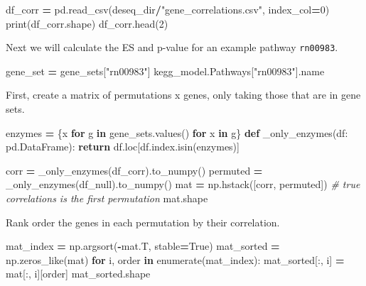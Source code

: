 \documentclass[
]{book}
\newenvironment{Shaded}{\begin{snugshade}}{\end{snugshade}}
\newcommand{\BuiltInTok}[1]{#1}
\newcommand{\CommentTok}[1]{\textcolor[rgb]{0.56,0.35,0.01}{\textit{#1}}}
\newcommand{\ControlFlowTok}[1]{\textcolor[rgb]{0.13,0.29,0.53}{\textbf{#1}}}
\newcommand{\DecValTok}[1]{\textcolor[rgb]{0.00,0.00,0.81}{#1}}
\newcommand{\KeywordTok}[1]{\textcolor[rgb]{0.13,0.29,0.53}{\textbf{#1}}}
\newcommand{\NormalTok}[1]{#1}
\newcommand{\OperatorTok}[1]{\textcolor[rgb]{0.81,0.36,0.00}{\textbf{#1}}}
\newcommand{\StringTok}[1]{\textcolor[rgb]{0.31,0.60,0.02}{#1}}
\newcommand{\VariableTok}[1]{\textcolor[rgb]{0.00,0.00,0.00}{#1}}
\begin{document}
\begin{Shaded}
\begin{Highlighting}[numbers=left,,]
\NormalTok{df\_corr }\OperatorTok{=}\NormalTok{ pd.read\_csv(deseq\_dir}\OperatorTok{/}\StringTok{"gene\_correlations.csv"}\NormalTok{, index\_col}\OperatorTok{=}\DecValTok{0}\NormalTok{)}
\BuiltInTok{print}\NormalTok{(df\_corr.shape)}
\NormalTok{df\_corr.head(}\DecValTok{2}\NormalTok{)}
\end{Highlighting}
\end{Shaded}

Next we will calculate the ES and p-value for an example pathway \texttt{rn00983}.

\begin{Shaded}
\begin{Highlighting}[numbers=left,,]
\NormalTok{gene\_set }\OperatorTok{=}\NormalTok{ gene\_sets[}\StringTok{"rn00983"}\NormalTok{]}
\NormalTok{kegg\_model.Pathways[}\StringTok{"rn00983"}\NormalTok{].name}
\end{Highlighting}
\end{Shaded}

First, create a matrix of permutations x genes, only taking those that are in gene sets.

\begin{Shaded}
\begin{Highlighting}[numbers=left,,]
\NormalTok{enzymes }\OperatorTok{=}\NormalTok{ \{x }\ControlFlowTok{for}\NormalTok{ g }\KeywordTok{in}\NormalTok{ gene\_sets.values() }\ControlFlowTok{for}\NormalTok{ x }\KeywordTok{in}\NormalTok{ g\}}
\KeywordTok{def}\NormalTok{ \_only\_enzymes(df: pd.DataFrame):}
    \ControlFlowTok{return}\NormalTok{ df.loc[df.index.isin(enzymes)]}

\NormalTok{corr }\OperatorTok{=}\NormalTok{ \_only\_enzymes(df\_corr).to\_numpy()}
\NormalTok{permuted }\OperatorTok{=}\NormalTok{ \_only\_enzymes(df\_null).to\_numpy()}
\NormalTok{mat }\OperatorTok{=}\NormalTok{ np.hstack([corr, permuted]) }\CommentTok{\# true correlations is the first permutation}
\NormalTok{mat.shape}
\end{Highlighting}
\end{Shaded}

Rank order the genes in each permutation by their correlation.

\begin{Shaded}
\begin{Highlighting}[numbers=left,,]
\NormalTok{mat\_index }\OperatorTok{=}\NormalTok{ np.argsort(}\OperatorTok{{-}}\NormalTok{mat.T, stable}\OperatorTok{=}\VariableTok{True}\NormalTok{)}
\NormalTok{mat\_sorted }\OperatorTok{=}\NormalTok{ np.zeros\_like(mat)}
\ControlFlowTok{for}\NormalTok{ i, order }\KeywordTok{in} \BuiltInTok{enumerate}\NormalTok{(mat\_index):}
\NormalTok{    mat\_sorted[:, i] }\OperatorTok{=}\NormalTok{ mat[:, i][order]}
\NormalTok{mat\_sorted.shape}
\end{Highlighting}
\end{Shaded}
\end{document}
